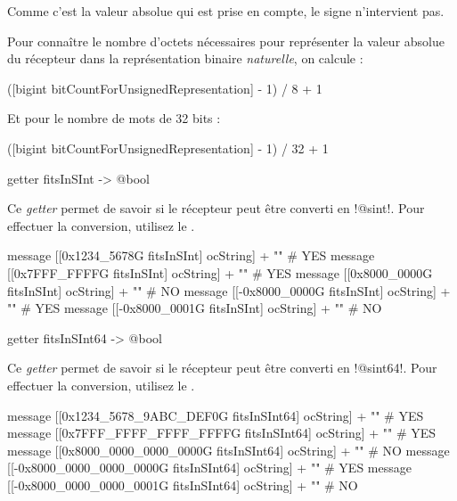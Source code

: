 Comme c'est la valeur absolue qui est prise en compte, le signe n'intervient pas.

Pour connaître le nombre d'octets nécessaires pour représenter la valeur absolue du récepteur dans la représentation binaire \emph{naturelle}, on calcule :
\begin{galgas}
([bigint bitCountForUnsignedRepresentation] - 1) / 8 + 1 
\end{galgas}

Et pour le nombre de mots de 32 bits :
\begin{galgas}
([bigint bitCountForUnsignedRepresentation] - 1) / 32 + 1 
\end{galgas}


\begin{galgasbox}
getter fitsInSInt -> @bool
\end{galgasbox}

Ce \emph{getter} permet de savoir si le récepteur peut être converti en \ggs!@sint!. Pour effectuer la conversion, utilisez le .

\begin{galgas}
message [[0x1234_5678G fitsInSInt] ocString] + "\n" # YES
message [[0x7FFF_FFFFG fitsInSInt] ocString] + "\n" # YES
message [[0x8000_0000G fitsInSInt] ocString] + "\n" # NO
message [[-0x8000_0000G fitsInSInt] ocString] + "\n" # YES
message [[-0x8000_0001G fitsInSInt] ocString] + "\n" # NO
\end{galgas}





\begin{galgasbox}
getter fitsInSInt64 -> @bool
\end{galgasbox}

Ce \emph{getter} permet de savoir si le récepteur peut être converti en \ggs!@sint64!. Pour effectuer la conversion, utilisez le .

\begin{galgas}
message [[0x1234_5678_9ABC_DEF0G fitsInSInt64] ocString] + "\n" # YES
message [[0x7FFF_FFFF_FFFF_FFFFG fitsInSInt64] ocString] + "\n" # YES
message [[0x8000_0000_0000_0000G fitsInSInt64] ocString] + "\n" # NO
message [[-0x8000_0000_0000_0000G fitsInSInt64] ocString] + "\n" # YES
message [[-0x8000_0000_0000_0001G fitsInSInt64] ocString] + "\n" # NO
\end{galgas}




